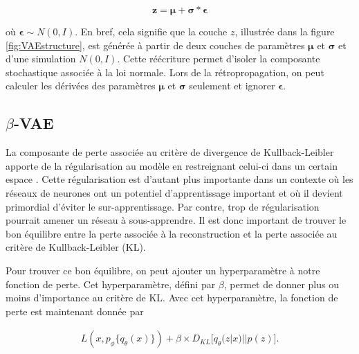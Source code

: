 \begin{equation} \label{eq:latent_formula}
\boldsymbol{z} = \boldsymbol{\mu} + \boldsymbol{\sigma} *\boldsymbol{\epsilon}
\end{equation}

où $\boldsymbol{\epsilon} \sim N(0,I)$. En bref, cela signifie que la couche $z$, illustrée dans la figure \ref{fig:VAEstructure}, est générée à partir de deux couches de paramètres $\boldsymbol{\mu}$ et $\boldsymbol{\sigma}$ et d'une simulation $N(0,I)$. Cette réécriture permet d'isoler la composante stochastique associée à la loi normale. Lors de la rétropropagation, on peut calculer les dérivées des paramètres $\boldsymbol{\mu}$ et $\boldsymbol{\sigma}$ seulement et ignorer $\boldsymbol{\epsilon}$. 

\subsection{$\beta$-VAE} \label{beta-vae}

La composante de perte associée au critère de divergence de Kullback-Leibler apporte de la régularisation au modèle en restreignant celui-ci dans un certain espace \citep{kingma2013autoencoding}. Cette régularisation est d'autant plus importante dans un contexte où les réseaux de neurones ont un potentiel d'apprentissage important et où il devient primordial d'éviter le sur-apprentissage. Par contre, trop de régularisation pourrait amener un réseau à sous-apprendre. Il est donc important de trouver le bon équilibre entre la perte associée à la reconstruction et la perte associée au critère de Kullback-Leibler (KL).

Pour trouver ce bon équilibre, on peut ajouter un hyperparamètre à notre fonction de perte. Cet hyperparamètre, défini par $\beta$, permet de donner plus ou moins d'importance au critère de KL. Avec cet hyperparamètre, la fonction de perte est maintenant donnée par

\begin{gather}  \label{eq:loss_betavae}
L(x, p_\phi\{q_\theta(x)\}) +  \beta \times D_{KL}\big[q_\theta(z|x) || p(z)\big].
\end{gather}

